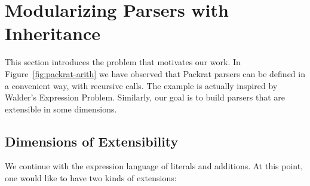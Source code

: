 \section{Modularizing Parsers with Inheritance}\label{sec:inheritance}

This section introduces the problem that motivates our work. In Figure~\ref{fig:packrat-arith} we have observed
that Packrat parsers can be defined in a convenient way, with recursive calls. The example is actually inspired
by Walder's Expression Problem. Similarly, our goal is to build parsers that are extensible in some dimensions.

\subsection{Dimensions of Extensibility}\label{subsec:dimensions}
We continue with the expression language of literals and additions. At this point,
one would like to have two kinds of extensions:

%

\begin{comment}
Basically, \name consists of four parts: underlying parsing technique, delegation mechanism encoded by open recursion, Object Algebras, and glue code of new combinators and utility functions. We start from Section \ref{subsec:overview-parsing}, which discusses the choice of parsing technique and how it affects modularity of parsers. Section \ref{subsec:overview-problem} demonstrates the goal of extending parsers together with ASTs in a semantic modular way, with both separate compilation and type-safe code reuse. Then we will see traditional parser combinators fail to achieve it because of hard-coded recursive calls. In Section \ref{subsec:overview-delegation}, we show how delegation can solve this problem and allow us to build extensible parsers. Finally, Section \ref{subsec:overview-oa} gives examples of using Object Algebras for more extensibility, including extension of operations and parsing multiple sorts of syntax.\haoyuan{TODO}
\end{comment}

